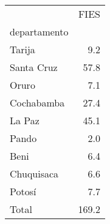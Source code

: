 \begin{tabular}{lr}
\toprule
{} &   FIES \\
departamento &        \\
\midrule
Tarija       &    9.2 \\
Santa Cruz   &   57.8 \\
Oruro        &    7.1 \\
Cochabamba   &   27.4 \\
La Paz       &   45.1 \\
Pando        &    2.0 \\
Beni         &    6.4 \\
Chuquisaca   &    6.6 \\
Potosí       &    7.7 \\
Total        &  169.2 \\
\bottomrule
\end{tabular}

